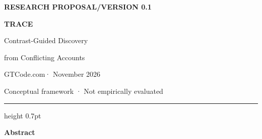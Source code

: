 \documentclass[11pt,a4paper]{article}
\renewenvironment{abstract}{%
  \par\vspace{1.1em}%
  {\sffamily\bfseries\color{CNSInk} Abstract\par}%
  \vspace{0.35em}\small\setlength{\parindent}{0pt}\noindent\ignorespaces
}{\par\vspace{0.9em}\normalsize}
\begin{document}
\thispagestyle{opening}
\begingroup
\raggedright
{\small\sffamily\bfseries\color{CNSBlue} RESEARCH PROPOSAL\enspace /\enspace VERSION 0.1\par}
\vspace{1em}
{\fontsize{27}{31}\selectfont\bfseries TRACE\par}
\vspace{0.55em}
{\Large Contrast-Guided Discovery\par}
\vspace{0.18em}
{\large from Conflicting Accounts\par}
\vspace{0.9em}
{\normalsize\sffamily GTCode.com\enspace · November 2026\par}
\vspace{0.55em}
{\small\sffamily\color{CNSMuted} Conceptual framework · Not empirically evaluated\par}
\endgroup
\vspace{0.8em}
{\color{CNSBlue}\hrule height 0.7pt}
\begin{abstract}
\end{abstract}




\end{document}
